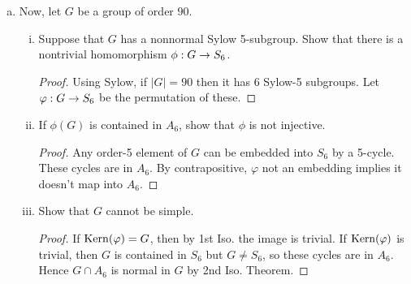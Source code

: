 \begin{itemize}
\begin{enumerate}[(a)]
\item Now, let $G$ be a group of order 90.
    \begin{enumerate}[(i)]
        \item Suppose that $G$ has a nonnormal Sylow 5-subgroup. Show that there is a nontrivial homomorphism $\phi: G \rightarrow S_6$.
        \begin{proof}
            Using Sylow, if $|G|=90$ then it has 6 Sylow-5 subgroups. Let $\varphi : G \rightarrow S_6$ be the permutation of these. 
        \end{proof}
        
        \item If $\phi(G)$ is contained in $A_6$, show that $\phi$ is not injective.
        \begin{proof}
            Any order-5 element of $G$ can be embedded into $S_6$ by a 5-cycle. These cycles are in $A_6$. By contrapositive, $\varphi$ not an embedding implies it doesn't map into $A_6$.
        \end{proof}
        
        \item Show that $G$ cannot be simple.
        \begin{proof}
            If $\operatorname{Kern}(\varphi) = G$, then by 1st Iso. the image is trivial. If $\operatorname{Kern}(\varphi)$ is trivial, then $G$ is contained in $S_6$ but $G \neq S_6$, so these cycles are in $A_6$. Hence $G \cap A_6$ is normal in $G$ by 2nd Iso. Theorem.
        \end{proof}
    \end{enumerate}
\end{enumerate}
















\end{itemize}